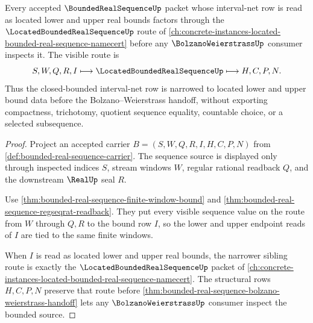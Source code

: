 \begin{theorem}
\label{thm:bounded-real-sequence-located-bound-handoff}
Every accepted $\BoundedRealSequenceUp$ packet whose interval-net row is read as located lower and upper real bounds factors through the $\LocatedBoundedRealSequenceUp$ route of \autoref{ch:concrete-instances-located-bounded-real-sequence-namecert} before any $\BolzanoWeierstrassUp$ consumer inspects it. The visible route is
$$
S,W,Q,R,I \longmapsto \LocatedBoundedRealSequenceUp \longmapsto H,C,P,N .
$$
Thus the closed-bounded interval-net row is narrowed to located lower and upper bound data before the Bolzano--Weierstrass handoff, without exporting compactness, trichotomy, quotient sequence equality, countable choice, or a selected subsequence.
\end{theorem}
\begin{proof}
Project an accepted carrier $B=(S,W,Q,R,I,H,C,P,N)$ from \autoref{def:bounded-real-sequence-carrier}. The sequence source is displayed only through inspected indices $S$, stream windows $W$, regular rational readback $Q$, and the downstream $\RealUp$ seal $R$.

Use \autoref{thm:bounded-real-sequence-finite-window-bound} and \autoref{thm:bounded-real-sequence-regseqrat-readback}. They put every visible sequence value on the route from $W$ through $Q,R$ to the bound row $I$, so the lower and upper endpoint reads of $I$ are tied to the same finite windows.

When $I$ is read as located lower and upper real bounds, the narrower sibling route is exactly the $\LocatedBoundedRealSequenceUp$ packet of \autoref{ch:concrete-instances-located-bounded-real-sequence-namecert}. The structural rows $H,C,P,N$ preserve that route before \autoref{thm:bounded-real-sequence-bolzano-weierstrass-handoff} lets any $\BolzanoWeierstrassUp$ consumer inspect the bounded source.
\end{proof}

